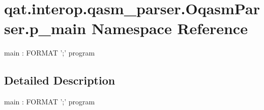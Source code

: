 \hypertarget{namespaceqat_1_1interop_1_1qasm__parser_1_1OqasmParser_1_1p__main}{\section{qat.\-interop.\-qasm\-\_\-parser.\-Oqasm\-Parser.\-p\-\_\-main Namespace Reference}
\label{namespaceqat_1_1interop_1_1qasm__parser_1_1OqasmParser_1_1p__main}
}


main \-: F\-O\-R\-M\-A\-T ';' program  




\subsection{Detailed Description}
main \-: F\-O\-R\-M\-A\-T ';' program 